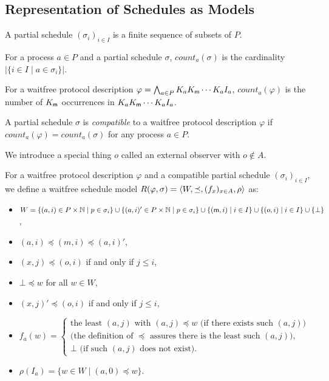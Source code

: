 \subsection{Representation of Schedules as Models}

\begin{definition}
 A partial schedule $(\sigma_i)_{i\in I}$ is a finite sequence of
 subsets of $P$.
\end{definition}

\begin{definition}
 For a process $a\in P$ and a partial schedule $\sigma$, $count_a(\sigma)$ is the cardinality
 $\left|\{i\in I\mid a\in \sigma_i\}\right|$.

 For a waitfree protocol description $\varphi = \bigwedge_{a\in P}K_a K_{\sf m} \cdots K_a I_a$,
 $count_a(\varphi)$ is the number of $K_{\sf m}$ occurrences in $K_aK_{\sf m} \cdots
 K_a I_a$.

 A partial schedule $\sigma$ is \textit{compatible} to a waitfree
 protocol description $\varphi$ if
 $count_a(\varphi) = count_a(\sigma)$ for any process $a\in P$.
\end{definition}

We introduce a special thing $o$ called an external observer with $o \notin A$.
\begin{definition}
 For a waitfree protocol description $\varphi$ and
 a compatible partial schedule $(\sigma_i)_{i\in I}$, we define
 a waitfree schedule model $R(\varphi, \sigma) = \langle{W, \preceq, (f_x)_{x\in A}, \rho}\rangle$ as:
\begin{itemize}
 \item $
	W = \{(a,i) \in P\times \mathbb N \mid p\in \sigma_i\} \cup
       \{(a,i)' \in P\times \mathbb N \mid p\in \sigma_i\} 
	 \cup \{({\sf m},i)\mid i\in I\} \cup \{(o,i) \mid i\in I\}\cup 
       \{\bot\}
       $,
 \item $(a,i) \preceq (m, i)\preceq (a, i)'$,
 \item $(x,j)\preceq (o,i)$ if and only if $j\le i$,
 \item $\bot\preceq w$ for all $w \in W$,
 \item $(x,j)'\preceq (o,i)$ if and only if $j \le i$,
 \item 
$
f_a(w) =
\left\{
\begin{array}{l}
 \mbox{the least $(a,j)$ with $(a,j)\preceq w$ (if there exists such $(a,j)$)} \\ 
  \mbox{(the definition of $\preceq$ assures there is the least such $(a,j)$)},\\
 \mbox{$\bot$ (if such $(a,j)$ does not exist)}.
\end{array}
\right.
$
 \item $\rho(I_a) = \{w\in W\mid (a,0)\preceq w\}$.
\end{itemize}
\end{definition}

